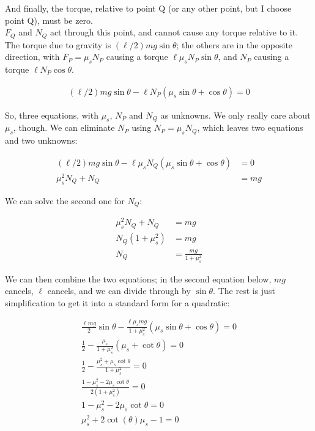 \documentclass[8.01x]{subfiles}
\begin{document}
And finally, the torque, relative to point Q (or any other point, but I choose point Q), must be zero.\\
$F_Q$ and $N_Q$ act through this point, and cannot cause any torque relative to it. The torque due to gravity is $(\ell/2) m g \sin \theta$; the others are in the opposite direction, with $F_P = \mu_s N_P$ causing a torque $\ell \mu_s N_P \sin \theta$, and $N_P$ causing a torque $\ell N_P \cos \theta$.

\begin{align}
(\ell/2) m g \sin \theta - \ell N_P (\mu_s \sin \theta + \cos \theta) = 0
\end{align}

So, three equations, with $\mu_s$, $N_P$ and $N_Q$ as unknowns. We only really care about $\mu_s$, though. We can eliminate $N_P$ using $N_P = \mu_s N_Q$, which leaves two equations and two unknowns:

\begin{align}
(\ell/2) m g \sin \theta - \ell \mu_s N_Q (\mu_s \sin \theta + \cos \theta) &= 0\\
\mu_s^2 N_Q + N_Q &= m g
\end{align}

We can solve the second one for $N_Q$:

\begin{align}
\mu_s^2 N_Q + N_Q &= m g\\
N_Q( 1+ \mu_s^2 ) &= m g\\
N_Q &= \frac{m g}{1 + \mu_s^2}
\end{align}

We can then combine the two equations; in the second equation below, $m g$ cancels, $\ell$ cancels, and we can divide through by $\sin \theta$. The rest is just simplification to get it into a standard form for a quadratic:

\begin{align}
\frac{\ell m g}{2} \sin \theta - \frac{\ell \mu_s m g}{1 + \mu_s^2} (\mu_s \sin \theta + \cos \theta) = 0\\
\frac{1}{2} - \frac{\mu_s}{1 + \mu_s^2} (\mu_s + \cot \theta) = 0\\
\frac{1}{2} - \frac{\mu_s^2 + \mu_s \cot \theta}{1 + \mu_s^2} = 0\\
\frac{1 - \mu_s^2 - 2 \mu_s \cot \theta}{2(1 + \mu_s^2)} = 0\\
1 - \mu_s^2 - 2 \mu_s \cot \theta = 0\\
\mu_s^2 + 2 \cot (\theta) \mu_s - 1 = 0
\end{align}
\end{document}
